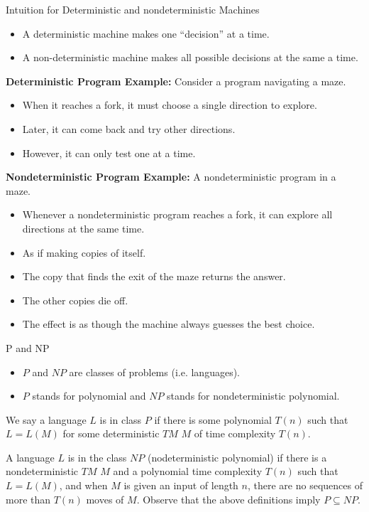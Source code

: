 \documentclass[style=sailor,size=12pt]{powerdot}
\theoremstyle{definition}
\newenvironment{defn}[1]
  {\renewcommand\theinnerdefn{#1}\innerdefn}
  {\endinnerdefn}
\newcommand{\mli}[1]{\mathit{#1}}
\begin{document}
\begin{wideslide}[bm=,toc=]{Intuition for Deterministic and nondeterministic Machines}
\begin{itemize}
\item A deterministic machine makes one ``decision'' at a time.
\item A non-deterministic machine makes all possible decisions at the same a time.
\end{itemize}
{\bf Deterministic Program Example:} Consider a program navigating a maze. 
\begin{itemize}
\item When it reaches a fork, it must choose a single direction to explore.
\item Later, it can come back and try other directions. 
\item However, it can only test one at a time.
\end{itemize}

{\bf Nondeterministic Program Example:} A nondeterministic program in a maze. 
\begin{itemize}
\item Whenever a nondeterministic program reaches a fork, it can explore all
directions at the same time. 
\item As if making copies of itself. 
\item The copy that finds the exit of the maze returns the answer.
\item The other copies die off. 
\item The effect is as though the machine always guesses the best choice.
\end{itemize}

\end{wideslide}

\begin{wideslide}[bm=,toc=]{P and NP}
\begin{itemize}
\item $P$ and $\mli{NP}$ are classes of problems (i.e. languages).
\item $P$ stands for polynomial and $\mli{NP}$ stands for nondeterministic
polynomial.
\end{itemize}
\begin{defn}{}[Hopcroft et al]
We say a language $L$ is in class $P$ if there is some polynomial $T(n)$ such
that $L = L(M)$ for some deterministic $\mli{TM}$ $M$ of time complexity
$T(n)$. 
\end{defn}

\begin{defn}{}[Hopcroft et al]
A language $L$ is in the class $\mli{NP}$ (nodeterministic polynomial) if there
is a nondeterministic $\mli{TM}$ $M$ and a polynomial time complexity $T(n)$
such that $L = L(M)$, and when $M$ is given an input of length $n$, there are
no sequences of more than $T(n)$ moves of $M$.
\end{defn}
Observe that the above definitions imply $P \subseteq \mli{NP}$.
\end{wideslide}
\end{document}
